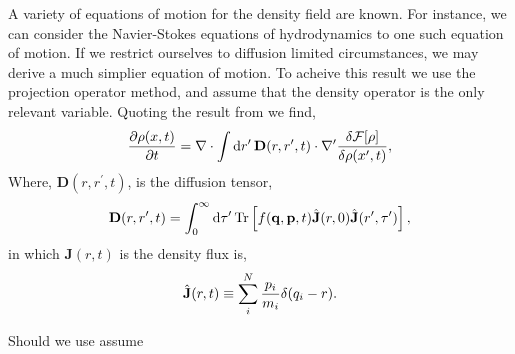 A variety of equations of motion for the density field are known.  For
instance, we can consider the Navier-Stokes equations of hydrodynamics to one
such equation of motion. If we restrict ourselves to diffusion limited
circumstances, we may derive a much simplier equation of motion. To acheive
this result we use the projection operator method, and assume that the 
density operator is the only relevant variable. Quoting the result from
\cite{ESPANOL09} we find,
%
\begin{equation}
    \label{eq:mean_eom}
    \frac{\partial \rho(x, t)}{\partial t} = 
        \nabla \cdot \int \mathrm{d}r^\prime\, \mathbf{D}(r, r^\prime, t) 
        \cdot \nabla^\prime \frac{\delta \mathcal{F}[\rho]}{\delta \rho(x^\prime, t)},
\end{equation}
%
Where, $\mathbf{D}(r, r^\prime, t)$, is the diffusion tensor,
%
\begin{equation}
    \mathbf{D}(r, r^\prime, t) = \int_0^\infty \mathrm{d}\tau^\prime\,
        \mathrm{Tr}\left[ f(\mathbf{q}, \mathbf{p}, t)\hat{\mathbf{J}}(r, 0)
        \hat{\mathbf{J}}(r^\prime, \tau^\prime) \right],
\end{equation}
%
in which $\mathbf{J}(r, t)$ is the density flux is,
%
\begin{equation}
    \hat{\mathbf{J}}(r, t) \equiv 
        \sum_i^N \frac{p_i}{m_i} \delta(q_i - r).
\end{equation}

Should we use assume 

